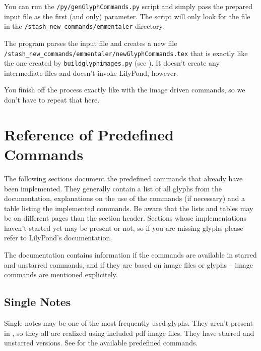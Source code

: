 \documentclass{article}
\begin{document}
You can run the \texttt{/py/genGlyphCommands.py} script and simply pass the prepared input file as the first (and only) parameter.
The script will only look for the file in the \texttt{/stash\_new\_commands/emmentaler} directory.

The program parses the input file and creates a new file \texttt{/stash\_new\_commands/emmentaler/newGlyphCommands.tex} that is exactly like the one created by \texttt{buildglyphimages.py} (see ).
It doesn't create any intermediate files and doesn't invoke LilyPond, however.

You finish off the process exactly like with the image driven commands, so we don't have to repeat that here.

\pagebreak
\section{Reference of Predefined Commands}
\label{sec:list_predefined_commands}
The following sections document the predefined commands that already have been implemented.
They generally contain a list of all glyphs from the \emmentaler documentation, explanations on the use of the commands (if necessary) and a table listing the implemented commands.
Be aware that the lists and tables may be on different pages than the section header.
Sections whose implementations haven't started yet may be present or not, so if you are missing glyphs please refer to LilyPond's documentation.

The documentation contains information if the commands are available in starred and unstarred commands, and if they are based on image files or \emmentaler glyphs -- image commands are mentioned explicitely.

\subsection{Single Notes}
\label{subsec:singlenotes}
Single notes may be one of the most frequently used glyphs.
They aren't present in \emmentaler*, so they all are realized using included pdf image files.
They have starred and unstarred versions.
See  for the available predefined commands.
\end{document}
